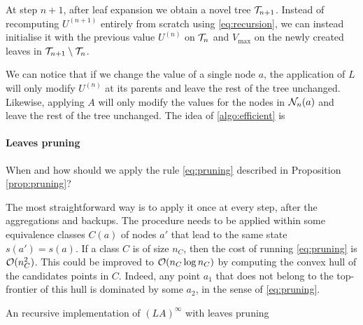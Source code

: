 \documentclass{article}
\begin{document}
At step $n+1$, after leaf expansion we obtain a novel tree $\mathcal{T}_{n+1}$. Instead of recomputing $U^{(n+1)}$ entirely from scratch using \eqref{eq:recursion}, we can instead initialise it with the previous value $U^{(n)}$ on $\mathcal{T}_n$ and $V_{\max}$ on the newly created leaves in $\mathcal{T}_{n+1} \setminus \mathcal{T}_n$.

We can notice that if we change the value of a single node $a$, the application of $L$ will only modify $U^{(n)}$ at its parents and leave the rest of the tree unchanged. Likewise, applying $A$ will only modify the values for the nodes in $\mathcal{N}_n(a)$ and leave the rest of the tree unchanged. The idea of \autoref{algo:efficient} is

\paragraph{Leaves pruning}

When and how should we apply the rule \eqref{eq:pruning} described in Proposition \autoref{prop:pruning}?

The most straightforward way is to apply it once at every step, after the aggregations and backups.
The procedure needs to be applied within some equivalence classes $C(a)$ of nodes $a'$ that lead to the same state $s(a')=s(a)$. If a class $C$ is of size $n_C$, then the cost of running \eqref{eq:pruning} is $\mathcal{O}(n_C^2)$. This could be improved to $\mathcal{O}(n_C \log n_C)$ by computing the convex hull of the candidates points in $C$. Indeed, any point $a_1$ that does not belong to the top-frontier of this hull is dominated by some $a_2$, in the sense of \eqref{eq:pruning}.


\begin{algorithm}[htp]
  \SetAlgoLined\DontPrintSemicolon
  
  \setcounter{AlgoLine}{0}
  \caption{An recursive implementation of $(LA)^\infty$ with leaves pruning}
  \label{algo:efficient}
\end{algorithm} 
\end{document}
